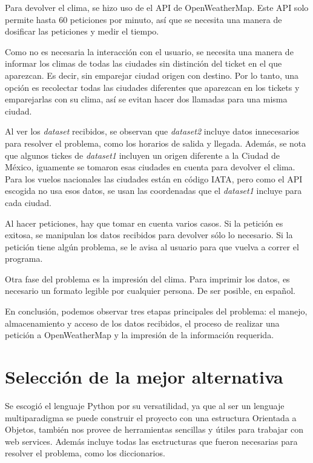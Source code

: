 \documentclass[]{article}
\begin{document}
Para devolver el clima, se hizo uso de el API de OpenWeatherMap. Este API
solo permite hasta 60 peticiones por minuto, así que se necesita una 
manera de dosificar las peticiones y medir el tiempo.

Como no es necesaria la interacción con el usuario, se necesita 
una manera de informar los climas de todas las ciudades sin distinción del 
ticket en el que aparezcan. Es decir, sin emparejar ciudad origen con 
destino. Por lo tanto, una opción es recolectar todas las ciudades 
diferentes que aparezcan en los tickets y emparejarlas con su clima, así 
se evitan hacer dos llamadas para una misma ciudad.

Al ver los \emph{dataset} recibidos, se observan que \emph{dataset2} incluye 
datos innecesarios para resolver el problema, como los horarios de salida y 
llegada. Además, se nota que algunos tickes de \emph{dataset1} incluyen un 
origen diferente a la Ciudad de México, iguamente se tomaron esas ciudades 
en cuenta para devolver el clima. Para los vuelos nacionales las ciudades están 
en código IATA, pero como el API escogida no usa esos datos, se usan las 
coordenadas que el \emph{dataset1} incluye para cada ciudad. 

Al hacer peticiones, hay que tomar en cuenta varios casos. Si la petición 
es exitosa, se manipulan los datos recibidos para devolver sólo lo 
necesario. Si la petición tiene algún problema, se le avisa al usuario para 
que vuelva a correr el programa. 

Otra fase del problema es la impresión del clima. Para imprimir los datos, es 
necesario un formato legible por cualquier persona. De ser posible, en 
español.

En conclusión, podemos observar tres etapas principales del problema: 
el manejo, almacenamiento y acceso de los datos recibidos, el proceso de 
realizar una petición a OpenWeatherMap y la impresión de la información 
requerida.

\section{Selección de la mejor alternativa}
Se escogió el lenguaje Python por su versatilidad, ya que al ser un lenguaje 
multiparadigma se puede construir el proyecto con una estructura Orientada 
a Objetos, también nos provee de herramientas sencillas y útiles para trabajar 
con web services. Además incluye todas las esctructuras que fueron 
necesarias para resolver el problema, como los diccionarios.
\end{document}
